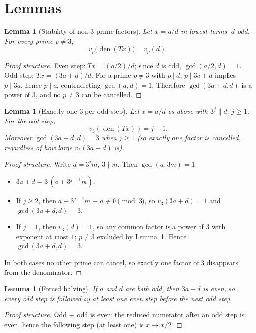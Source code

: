 \documentclass[11pt]{article}
\newtheorem{lemma}[theorem]{Lemma}
\theoremstyle{remark}
\DeclareMathOperator{\den}{den}
\newcommand{\vthree}{v_3}
\newcommand{\vP}[1]{v_{#1}}
\begin{document}
\section{Lemmas}

\begin{lemma}[Stability of non-3 prime factors]\label{lem:non3}
Let \(x = a/d\) in lowest terms, \(d\) odd. For every prime \(p \neq 3\),
\[
  \vP{p}\big(\den(Tx)\big) = \vP{p}(d).
\]
\end{lemma}
\begin{proof}[Proof structure]
Even step: \(Tx = (a/2)/d\); since \(d\) is odd, \(\gcd(a/2, d) = 1\).
Odd step: \(Tx = (3a + d)/d\). For a prime \(p \ne 3\) with \(p \mid d\),
\(p \mid 3a + d\) implies \(p \mid 3a\), hence \(p \mid a\), contradicting
\(\gcd(a, d) = 1\). Therefore \(\gcd(3a + d, d)\) is a power of \(3\), and no
\(p \ne 3\) can be cancelled.
\end{proof}

\begin{lemma}[Exactly one 3 per odd step]\label{lem:three}
Let \(x = a/d\) as above with \(3^{j} \| d\), \(j \ge 1\). For the odd step,
\[
  \vthree(\den(Tx)) = j - 1.
\]
Moreover \(\gcd(3a + d, d) = 3\) when \(j \ge 1\) (so exactly one factor is
cancelled, regardless of how large \(\vthree(3a+d)\) is).
\end{lemma}
\begin{proof}[Proof structure]
Write \(d = 3^{j} m\), \(3 \nmid m\). Then \(\gcd(a, 3m) = 1\).
\begin{itemize}
  \item \(3a + d = 3\,(a + 3^{j-1} m)\).
  \item If \(j \ge 2\), then \(a + 3^{j-1} m \equiv a \not\equiv 0 \pmod 3\),
        so \(\vthree(3a + d) = 1\) and \(\gcd(3a+d, d) = 3\).
  \item If \(j = 1\), then \(\vthree(d) = 1\), so any common factor is a
        power of \(3\) with exponent at most \(1\); \(p \ne 3\) excluded by
        Lemma~\ref{lem:non3}. Hence \(\gcd(3a+d, d) = 3\).
\end{itemize}
In both cases no other prime can cancel, so exactly one factor of \(3\)
disappears from the denominator.
\end{proof}

\begin{lemma}[Forced halving]\label{lem:halve}
If \(a\) and \(d\) are both odd, then \(3a + d\) is even, so every odd step is
followed by at least one even step before the next odd step.
\end{lemma}
\begin{proof}[Proof structure]
Odd + odd is even; the reduced numerator after an odd step is even, hence the
following step (at least one) is \(x \mapsto x/2\).
\end{proof}
\end{document}
